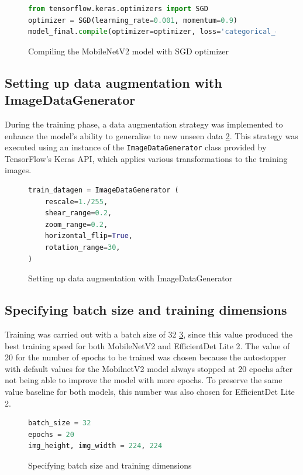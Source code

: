 \begin{figure}[H]
\begin{lstlisting}[language=Python]
from tensorflow.keras.optimizers import SGD
optimizer = SGD(learning_rate=0.001, momentum=0.9)
model_final.compile(optimizer=optimizer, loss='categorical_crossentropy', metrics=['accuracy'])
\end{lstlisting}
\caption{Compiling the MobileNetV2 model with SGD optimizer}
\label{code:compile_model}
\end{figure}

\subsection{Setting up data augmentation with ImageDataGenerator}
During the training phase, a data augmentation strategy was implemented to enhance the model's ability to generalize to new unseen data \ref{code:data_augmentation}. This strategy was executed using an instance of the \texttt{ImageDataGenerator} class provided by TensorFlow's Keras API, which applies various transformations to the training images.

\begin{figure}[H]
\begin{lstlisting}[language=Python]
train_datagen = ImageDataGenerator (
    rescale=1./255,
    shear_range=0.2,
    zoom_range=0.2,
    horizontal_flip=True,
    rotation_range=30,
)
\end{lstlisting}
\caption{Setting up data augmentation with ImageDataGenerator}
\label{code:data_augmentation}
\end{figure}

\subsection{Specifying batch size and training dimensions}
Training was carried out with a batch size of 32 \ref{code:training_params}, since this value produced the best training speed for both MobileNetV2 and EfficientDet Lite 2. The value of 20 for the number of epochs to be trained was chosen because the autostopper with default values for the MobilnetV2 model always stopped at 20 epochs after not being able to improve the model with more epochs. To preserve the same value baseline for both models, this number was also chosen for EfficientDet Lite 2.

\begin{figure}[H]
\begin{lstlisting}[language=Python]
batch_size = 32
epochs = 20
img_height, img_width = 224, 224
\end{lstlisting}
\caption{Specifying batch size and training dimensions}
\label{code:training_params}
\end{figure}


